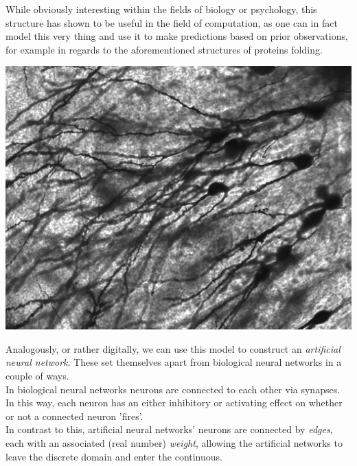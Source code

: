 \begin{multicols}{2}

\noindent While obviously interesting within the fields of biology or psychology, this structure has shown 
to be useful in the field of computation, as one can in fact model this very 
thing and use it to make predictions based on prior observations, for example in regards to the 
aforementioned structures of proteins folding.\\
\begin{Figure}
 \centering
 \includegraphics[width=0.8\linewidth]{images/Gyrus_Dentatus_40x}
 \captionsetup{width=0.8\linewidth, font=small}
\end{Figure}
\noindent Analogously, or rather digitally, we can use this model to construct an \textit{artificial 
neural network}.
These set themselves apart from biological neural networks in a couple of ways. \\
In biological neural networks neurons are connected to each other via synapses. In this way, each neuron has an either inhibitory or activating effect on whether or not a connected neuron 'fires'.\\
In contrast to this, artificial neural networks' neurons are connected by \textit{edges}, each with an associated (real number) \textit{weight}, allowing the artificial networks to leave the discrete domain and enter the continuous.


\end{multicols}

